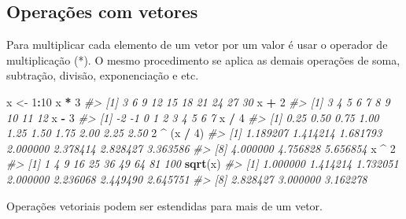\documentclass[]{book}
\newenvironment{Shaded}{\begin{snugshade}}{\end{snugshade}}
\newcommand{\KeywordTok}[1]{\textcolor[rgb]{0.13,0.29,0.53}{\textbf{#1}}}
\newcommand{\DecValTok}[1]{\textcolor[rgb]{0.00,0.00,0.81}{#1}}
\newcommand{\StringTok}[1]{\textcolor[rgb]{0.31,0.60,0.02}{#1}}
\newcommand{\CommentTok}[1]{\textcolor[rgb]{0.56,0.35,0.01}{\textit{#1}}}
\newcommand{\OperatorTok}[1]{\textcolor[rgb]{0.81,0.36,0.00}{\textbf{#1}}}
\newcommand{\NormalTok}[1]{#1}
\begin{document}
\subsection{Operações com vetores}\label{operacoes-com-vetores}

Para multiplicar cada elemento de um vetor por um valor é usar o
operador de multiplicação (*). O mesmo procedimento se aplica as demais
operações de soma, subtração, divisão, exponenciação e etc.

\begin{Shaded}
\begin{Highlighting}[]
\NormalTok{x <-}\StringTok{ }\DecValTok{1}\OperatorTok{:}\DecValTok{10}
\NormalTok{x }\OperatorTok{*}\StringTok{ }\DecValTok{3}
\CommentTok{#>  [1]  3  6  9 12 15 18 21 24 27 30}
\NormalTok{x }\OperatorTok{+}\StringTok{ }\DecValTok{2}
\CommentTok{#>  [1]  3  4  5  6  7  8  9 10 11 12}
\NormalTok{x }\OperatorTok{-}\StringTok{ }\DecValTok{3}
\CommentTok{#>  [1] -2 -1  0  1  2  3  4  5  6  7}
\NormalTok{x }\OperatorTok{/}\StringTok{ }\DecValTok{4}
\CommentTok{#>  [1] 0.25 0.50 0.75 1.00 1.25 1.50 1.75 2.00 2.25 2.50}
\DecValTok{2} \OperatorTok{^}\StringTok{ }\NormalTok{(x }\OperatorTok{/}\StringTok{ }\DecValTok{4}\NormalTok{)}
\CommentTok{#>  [1] 1.189207 1.414214 1.681793 2.000000 2.378414 2.828427 3.363586}
\CommentTok{#>  [8] 4.000000 4.756828 5.656854}
\NormalTok{x }\OperatorTok{^}\StringTok{ }\DecValTok{2}
\CommentTok{#>  [1]   1   4   9  16  25  36  49  64  81 100}
\KeywordTok{sqrt}\NormalTok{(x)}
\CommentTok{#>  [1] 1.000000 1.414214 1.732051 2.000000 2.236068 2.449490 2.645751}
\CommentTok{#>  [8] 2.828427 3.000000 3.162278}
\end{Highlighting}
\end{Shaded}

Operações vetoriais podem ser estendidas para mais de um vetor.
\end{document}
